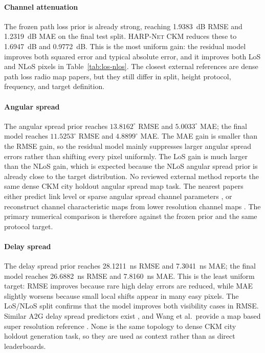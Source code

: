 \documentclass[journal]{IEEEtran}
\begin{document}
\paragraph{Channel attenuation}
The frozen path loss prior is already strong, reaching \SI{1.9383}{dB} RMSE
and \SI{1.2319}{dB} MAE on the final test split. \textsc{HARP-Net CKM}
reduces these to \SI{1.6947}{dB} and \SI{0.9772}{dB}. This is the most
uniform gain: the residual model improves both squared error and typical
absolute error, and it improves both LoS and NLoS pixels in
Table~\ref{tab:los-nlos}. The closest external references are dense path loss
radio map papers, but they still differ in split, height protocol, frequency,
and target definition.

\paragraph{Angular spread}
The angular spread prior reaches \(13.8162^\circ\) RMSE and \(5.0033^\circ\)
MAE; the final model reaches \(11.5253^\circ\) RMSE and \(4.8899^\circ\) MAE.
The MAE gain is smaller than the RMSE gain, so the residual model mainly suppresses larger angular
spread errors rather than shifting every pixel uniformly. The LoS gain is much
larger than the NLoS gain, which is expected because the NLoS angular spread
prior is already close to the target distribution. No reviewed external method
reports the same dense CKM city holdout angular spread map task. The nearest
papers either predict link level or sparse angular spread channel parameters
\cite{huang2025a2gtransformer,mi2024pointcloud}, or reconstruct channel
characteristic maps from lower resolution channel maps
\cite{wang2023multitasksr}. The primary numerical comparison is therefore
against the frozen prior and the same protocol target.

\paragraph{Delay spread}
The delay spread prior reaches \SI{28.1211}{ns} RMSE and \SI{7.3041}{ns} MAE;
the final model reaches \SI{26.6882}{ns} RMSE and \SI{7.8160}{ns} MAE. This
is the least uniform target: RMSE improves because rare high delay errors are
reduced, while MAE slightly worsens because small local shifts appear in many
easy pixels. The LoS/NLoS split confirms that the model improves both
visibility cases in RMSE. Similar A2G delay spread predictors exist
\cite{yang2019a2gml,huang2025a2gtransformer}, and Wang et al.\ provide a
map based super resolution reference \cite{wang2023multitasksr}. None is the
same topology to dense CKM city holdout generation task, so they are used as
context rather than as direct leaderboards.
\end{document}
